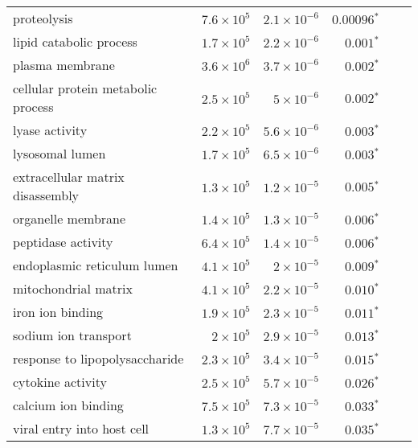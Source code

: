 \begin{longtable}{|l|r|r|r|r|r|}
                              proteolysis & $7.6\times 10^{5}$ &  $2.1\times 10^{-6}$ &             $\bm{0.00096{^*}}$ \\
                  lipid catabolic process & $1.7\times 10^{5}$ &  $2.2\times 10^{-6}$ &              $\bm{ 0.001{^*}}$ \\
                          plasma membrane & $3.6\times 10^{6}$ &  $3.7\times 10^{-6}$ &              $\bm{ 0.002{^*}}$ \\
       cellular protein metabolic process & $2.5\times 10^{5}$ &   $ 5\times 10^{-6}$ &              $\bm{ 0.002{^*}}$ \\
                           lyase activity & $2.2\times 10^{5}$ &  $5.6\times 10^{-6}$ &              $\bm{ 0.003{^*}}$ \\
                          lysosomal lumen & $1.7\times 10^{5}$ &  $6.5\times 10^{-6}$ &              $\bm{ 0.003{^*}}$ \\
         extracellular matrix disassembly & $1.3\times 10^{5}$ &  $1.2\times 10^{-5}$ &              $\bm{ 0.005{^*}}$ \\
                       organelle membrane & $1.4\times 10^{5}$ &  $1.3\times 10^{-5}$ &              $\bm{ 0.006{^*}}$ \\
                       peptidase activity & $6.4\times 10^{5}$ &  $1.4\times 10^{-5}$ &              $\bm{ 0.006{^*}}$ \\
              endoplasmic reticulum lumen & $4.1\times 10^{5}$ &   $ 2\times 10^{-5}$ &              $\bm{ 0.009{^*}}$ \\
                     mitochondrial matrix & $4.1\times 10^{5}$ &  $2.2\times 10^{-5}$ &              $\bm{ 0.010{^*}}$ \\
                         iron ion binding & $1.9\times 10^{5}$ &  $2.3\times 10^{-5}$ &              $\bm{ 0.011{^*}}$ \\
                     sodium ion transport &  $ 2\times 10^{5}$ &  $2.9\times 10^{-5}$ &              $\bm{ 0.013{^*}}$ \\
           response to lipopolysaccharide & $2.3\times 10^{5}$ &  $3.4\times 10^{-5}$ &              $\bm{ 0.015{^*}}$ \\
                        cytokine activity & $2.5\times 10^{5}$ &  $5.7\times 10^{-5}$ &              $\bm{ 0.026{^*}}$ \\
                      calcium ion binding & $7.5\times 10^{5}$ &  $7.3\times 10^{-5}$ &              $\bm{ 0.033{^*}}$ \\
               viral entry into host cell & $1.3\times 10^{5}$ &  $7.7\times 10^{-5}$ &              $\bm{ 0.035{^*}}$ \\

\end{longtable}
